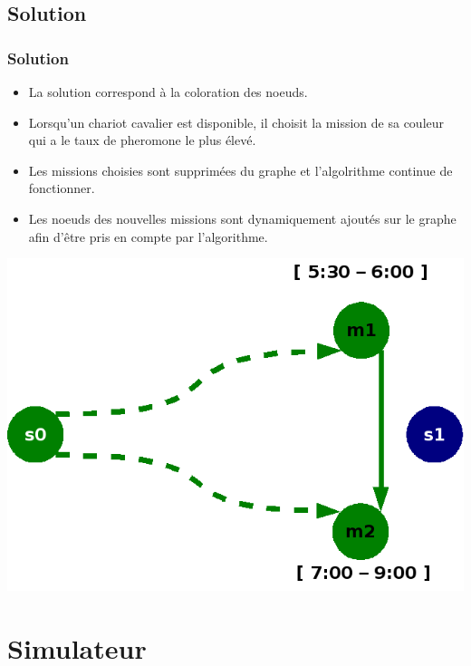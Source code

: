 \documentclass{beamer}
\begin{document}
\subsection*{Solution}
\begin{frame}
\frametitle{Solution}

	\begin{itemize}
	  \item La solution correspond à la coloration des noeuds.
	  \item Lorsqu'un chariot cavalier est disponible, il choisit la mission de sa couleur qui a le taux de pheromone le plus élevé.
	  \item Les missions choisies sont supprimées du graphe et l'algolrithme continue de fonctionner.
	  \item Les noeuds des nouvelles missions sont dynamiquement ajoutés sur le graphe afin d'être pris en compte par l'algorithme.
	\end{itemize}
	
	\begin{center}
		\includegraphics[height=.40\textheight]{fig/missionGraphWith2NodesRemoved.png}
	\end{center}
\end{frame}

\section{Simulateur}
\end{document}
